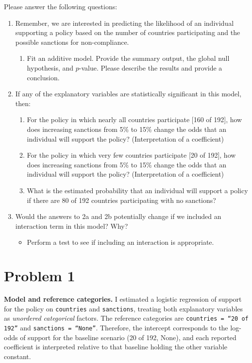 \documentclass[12pt,letterpaper]{article}
\begin{document}
\newpage
\noindent Please answer the following questions:

\begin{enumerate}
	\item
	Remember, we are interested in predicting the likelihood of an individual supporting a policy based on the number of countries participating and the possible sanctions for non-compliance.
	\begin{enumerate}
		\item [] Fit an additive model. Provide the summary output, the global null hypothesis, and $p$-value. Please describe the results and provide a conclusion.

	\end{enumerate}
	
	\item
	If any of the explanatory variables are statistically significant in this model, then:
	\begin{enumerate}
		\item
		For the policy in which nearly all countries participate [160 of 192], how does increasing sanctions from 5\% to 15\% change the odds that an individual will support the policy? (Interpretation of a coefficient)
		\item
		For the policy in which very few countries participate [20 of 192], how does increasing sanctions from 5\% to 15\% change the odds that an individual will support the policy? (Interpretation of a coefficient)
		\item
		What is the estimated probability that an individual will support a policy if there are 80 of 192 countries participating with no sanctions? 
	
	\end{enumerate}
	\item
	Would the answers to 2a and 2b potentially change if we included an interaction term in this model? Why? 
	\begin{itemize}
		\item Perform a test to see if including an interaction is appropriate.
	\end{itemize}
	\end{enumerate}

\newpage

\section*{Problem 1}

\noindent\textbf{Model and reference categories.}
I estimated a logistic regression of support for the policy on \texttt{countries} and \texttt{sanctions}, treating both explanatory variables as \emph{unordered categorical} factors. The reference categories are \texttt{countries = ``20 of 192''} and \texttt{sanctions = ``None''}. Therefore, the intercept corresponds to the log-odds of support for the baseline scenario (20 of 192, None), and each reported coefficient is interpreted relative to that baseline holding the other variable constant.
\end{document}

